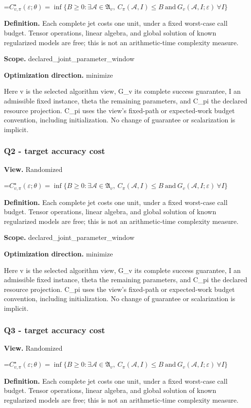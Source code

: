 \documentclass[10pt,a4paper]{article}
\newcommand{\AtlasMath}[1]{\par\begingroup\centering\setbox0=\hbox{$\displaystyle #1$}\ifdim\wd0>1.4\linewidth\typeout{ATLAS WIDE FORMULA: \the\wd0}\fi\ifdim\wd0>\linewidth\resizebox{\linewidth}{!}{\box0}\else\box0\fi\par\endgroup}
\begin{document}
\AtlasMath{C^\star_{v,\pi}(\varepsilon;\theta)=\inf\{B\ge0:\exists\mathcal A\in\mathfrak A_v,\ C_\pi(\mathcal A,I)\le B\ \text{and}\ G_v(\mathcal A,I;\varepsilon)\ \forall I\}}
\textbf{Definition.} Each complete jet costs one unit, under a fixed worst-case call budget. Tensor operations, linear algebra, and global solution of known regularized models are free; this is not an arithmetic-time complexity measure.

\textbf{Scope.} declared\_joint\_parameter\_window

\textbf{Optimization direction.} minimize

Here v is the selected algorithm view, G\_v its complete success guarantee, I an admissible fixed instance, theta the remaining parameters, and C\_pi the declared resource projection. C\_pi uses the view's fixed-path or expected-work budget convention, including initialization. No change of guarantee or scalarization is implicit.

\subsubsection{Q2 - target accuracy cost}
\textbf{View.} Randomized

\AtlasMath{C^\star_{v,\pi}(\varepsilon;\theta)=\inf\{B\ge0:\exists\mathcal A\in\mathfrak A_v,\ C_\pi(\mathcal A,I)\le B\ \text{and}\ G_v(\mathcal A,I;\varepsilon)\ \forall I\}}
\textbf{Definition.} Each complete jet costs one unit, under a fixed worst-case call budget. Tensor operations, linear algebra, and global solution of known regularized models are free; this is not an arithmetic-time complexity measure.

\textbf{Scope.} declared\_joint\_parameter\_window

\textbf{Optimization direction.} minimize

Here v is the selected algorithm view, G\_v its complete success guarantee, I an admissible fixed instance, theta the remaining parameters, and C\_pi the declared resource projection. C\_pi uses the view's fixed-path or expected-work budget convention, including initialization. No change of guarantee or scalarization is implicit.

\subsubsection{Q3 - target accuracy cost}
\textbf{View.} Randomized

\AtlasMath{C^\star_{v,\pi}(\varepsilon;\theta)=\inf\{B\ge0:\exists\mathcal A\in\mathfrak A_v,\ C_\pi(\mathcal A,I)\le B\ \text{and}\ G_v(\mathcal A,I;\varepsilon)\ \forall I\}}
\textbf{Definition.} Each complete jet costs one unit, under a fixed worst-case call budget. Tensor operations, linear algebra, and global solution of known regularized models are free; this is not an arithmetic-time complexity measure.
\end{document}
